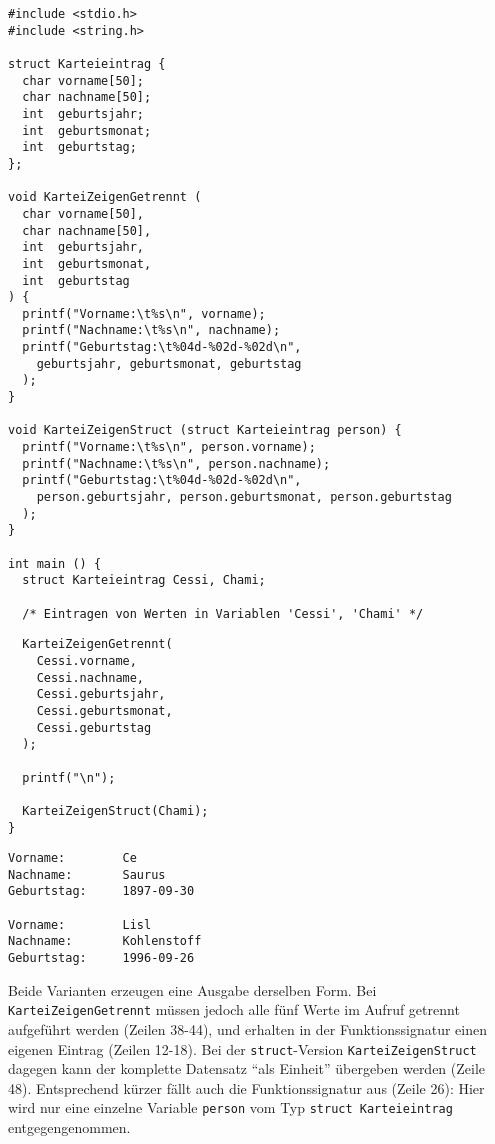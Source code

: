 \begin{codebox}
\begin{verbatim}
#include <stdio.h>
#include <string.h>

struct Karteieintrag {
  char vorname[50];
  char nachname[50];
  int  geburtsjahr;
  int  geburtsmonat;
  int  geburtstag;
};

void KarteiZeigenGetrennt (
  char vorname[50],
  char nachname[50],
  int  geburtsjahr,
  int  geburtsmonat,
  int  geburtstag
) {
  printf("Vorname:\t%s\n", vorname);
  printf("Nachname:\t%s\n", nachname);
  printf("Geburtstag:\t%04d-%02d-%02d\n",
    geburtsjahr, geburtsmonat, geburtstag
  );
}

void KarteiZeigenStruct (struct Karteieintrag person) {
  printf("Vorname:\t%s\n", person.vorname);
  printf("Nachname:\t%s\n", person.nachname);
  printf("Geburtstag:\t%04d-%02d-%02d\n",
    person.geburtsjahr, person.geburtsmonat, person.geburtstag
  );
}

int main () {
  struct Karteieintrag Cessi, Chami;
  
  /* Eintragen von Werten in Variablen 'Cessi', 'Chami' */
\end{verbatim}
\end{codebox}
\begin{codebox}[]
\begin{verbatim}
  KarteiZeigenGetrennt(
    Cessi.vorname,
    Cessi.nachname,
    Cessi.geburtsjahr,
    Cessi.geburtsmonat,
    Cessi.geburtstag
  );
  
  printf("\n");
  
  KarteiZeigenStruct(Chami); 
}
\end{verbatim}
\end{codebox}

\begin{cmdbox}
\begin{verbatim}
Vorname:        Ce
Nachname:       Saurus
Geburtstag:     1897-09-30

Vorname:        Lisl
Nachname:       Kohlenstoff
Geburtstag:     1996-09-26
\end{verbatim}
\end{cmdbox}

Beide Varianten erzeugen eine Ausgabe derselben Form. Bei \texttt{KarteiZeigenGetrennt} müssen jedoch alle fünf Werte im Aufruf getrennt aufgeführt werden (Zeilen 38-44), und erhalten in der Funktionssignatur einen eigenen Eintrag (Zeilen 12-18). Bei der \texttt{struct}-Version \texttt{KarteiZeigenStruct} dagegen kann der komplette Datensatz \enquote{als Einheit} übergeben werden (Zeile 48). Entsprechend kürzer fällt auch die Funktionssignatur aus (Zeile 26): Hier wird nur eine einzelne Variable \texttt{person} vom Typ \texttt{struct Karteieintrag} entgegengenommen.

